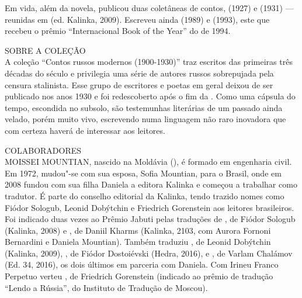 Em vida, além da novela, publicou duas coletâneas de contos,
{} (1927) e {} (1931) --- reunidas em
{} (ed. Kalinka, 2009). Escreveu ainda
{} (1989) e {} (1993), este que
recebeu o prêmio “Internacional Book of the Year” do {} de 1994.

\bigskip

\noindent{}SOBRE A COLEÇÃO\\

A coleção “Contos russos modernos (1900-1930)” traz escritos das
primeiras três décadas do século  e privilegia uma série de autores
russos sobrepujada pela censura stalinista. Esse grupo de escritores e
poetas em geral deixou de ser publicado nos anos 1930 e foi redescoberto
após o fim da . Como uma cápsula do tempo, escondida no subsolo, são
testemunhas literárias de um passado ainda velado, porém muito vivo,
escrevendo numa linguagem não raro inovadora que com certeza haverá de
interessar aos leitores.

\pagebreak

\noindent{}COLABORADORES\\

\noindent{}MOISSEI MOUNTIAN, nascido na Moldávia (), é formado em engenharia civil. Em 1972, mudou"-se com sua esposa, Sofia Mountian, para o Brasil,
onde em 2008 fundou com sua filha Daniela a editora Kalinka e começou a
trabalhar como tradutor. É parte do conselho editorial da Kalinka, tendo
trazido nomes como Fiódor Sologub, Leonid Dobýtchin e Friedrich
Gorenstein aos leitores brasileiros. Foi indicado duas vezes ao Prêmio
Jabuti pelas traduções de {}, de Fiódor Sologub
(Kalinka, 2008) e {}, de Daniil Kharms (Kalinka, 2103, com Aurora Fornoni
Bernardini e Daniela Mountian). Também traduziu {}, de Leonid Dobýtchin (Kalinka, 2009), {}, de Fiódor Dostoiévski
(Hedra, 2016), e {}, de
Varlam Chalámov (Ed. 34, 2016), os dois últimos em parceria com Daniela.
Com Irineu Franco Perpetuo verteu {}, de Friedrich Gorenstein
(indicado ao prêmio de tradução “Lendo a Rússia”, do Instituto de
Tradução de Moscou).

\medskip

